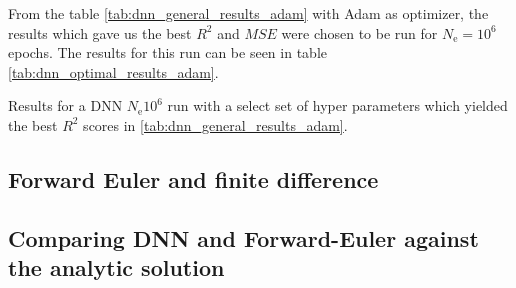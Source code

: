 
From the table \ref{tab:dnn_general_results_adam} with Adam as optimizer, the results which gave us the best $R^2$ and $MSE$ were chosen to be run for $N_\mathrm{e}=10^6$ epochs. The results for this run can be seen in table \ref{tab:dnn_optimal_results_adam}.
\begin{table}[h!tb]
    \centering
    \caption{Results for a DNN $N_\mathrm{e}10^6$ run with a select set of hyper parameters which yielded the best $R^2$ scores in \ref{tab:dnn_general_results_adam}.}
    \label{tab:dnn_optimal_results_adam}
\end{table}

\subsection{Forward Euler and finite difference}


\subsection{Comparing DNN and Forward-Euler against the analytic solution}

